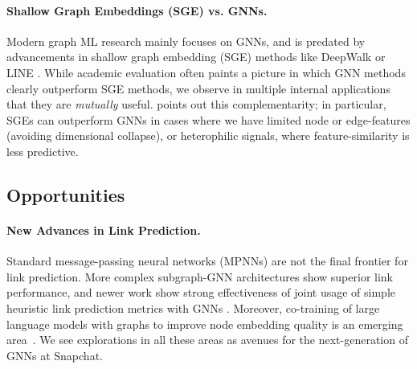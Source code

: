 \paragraph{Shallow Graph Embeddings (SGE) vs. GNNs.} Modern graph ML research mainly focuses on GNNs, and is predated by advancements in shallow graph embedding (SGE) methods like DeepWalk \cite{perozzi2014deepwalk} or LINE \cite{tang2015line}.  While academic evaluation often paints a picture in which GNN methods clearly outperform SGE methods, we observe in multiple internal applications that they are \emph{mutually} useful.  \citet{dongseesaw} points out this complementarity; in particular, SGEs can outperform GNNs in cases where we have limited node or edge-features (avoiding dimensional collapse), or heterophilic signals, where feature-similarity is less predictive.


\vspace{-0.05in}
\subsection{Opportunities}

\paragraph{New Advances in Link Prediction.} Standard message-passing neural networks (MPNNs) are not the final frontier for link prediction. More complex subgraph-GNN architectures \cite{zhang2018link, zhu2021neural, zhao2021stars} show superior link performance,
and newer work show strong effectiveness of joint usage of simple heuristic link prediction metrics with GNNs \cite{mao2024demystifying, mamixture}. Moreover, co-training of large language models with graphs to improve node embedding quality is an emerging area~\cite{chenllaga,ren2024survey}.  
We see explorations in all these areas as avenues for the next-generation of GNNs at Snapchat.

